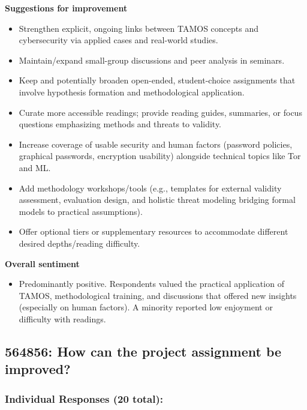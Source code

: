 \documentclass[a4paper]{report}
\begin{document}
\textbf{Suggestions for improvement}
\begin{itemize}
\item Strengthen explicit, ongoing links between TAMOS concepts and cybersecurity via applied cases and real-world studies.
\item Maintain/expand small-group discussions and peer analysis in seminars.
\item Keep and potentially broaden open-ended, student-choice assignments that involve hypothesis formation and methodological application.
\item Curate more accessible readings; provide reading guides, summaries, or focus questions emphasizing methods and threats to validity.
\item Increase coverage of usable security and human factors (password policies, graphical passwords, encryption usability) alongside technical topics like Tor and ML.
\item Add methodology workshops/tools (e.g., templates for external validity assessment, evaluation design, and holistic threat modeling bridging formal models to practical assumptions).
\item Offer optional tiers or supplementary resources to accommodate different desired depths/reading difficulty.
\end{itemize}

\textbf{Overall sentiment}
\begin{itemize}
\item Predominantly positive. Respondents valued the practical application of TAMOS, methodological training, and discussions that offered new insights (especially on human factors). A minority reported low enjoyment or difficulty with readings.
\end{itemize}

\subsection{564856: How can the project assignment be improved?}

\subsubsection{Individual Responses (20 total):}
\end{document}

